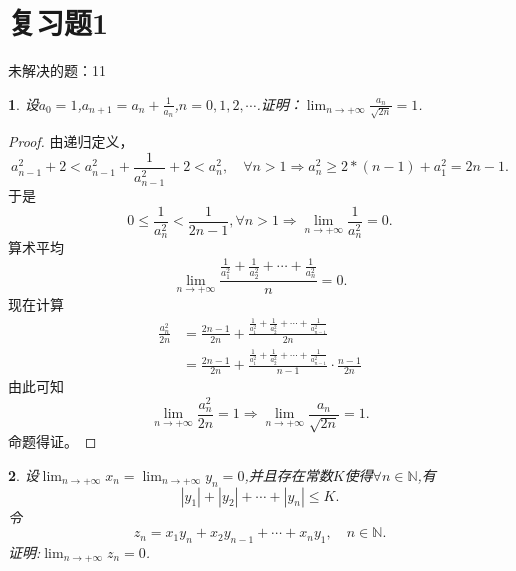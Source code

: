 \documentclass[utf8]{book}
\newtheorem{example}{}[section]             %
\begin{document}
\section{复习题1}
未解决的题：11\\
\begin{example}
设$a_0=1$,$a_{n+1}=a_n+\frac{1}{a_n}$,$n=0,1,2,\cdots$.证明：$\displaystyle\lim_{n\to +\infty}\frac{a_n}{\sqrt{2n}}= 1$.
\end{example}
\begin{proof}
由递归定义，
$$a_{n-1}^2+2 < a_{n-1}^2+\frac{1}{a^2_{n-1}} + 2< a_{n}^2,\quad\forall n > 1\Rightarrow a^2_{n}\geq 2*(n-1) + a_1^2=2n-1.$$
于是
$$0\leq \frac{1}{a_n^2} < \frac{1}{2n-1}, \forall n > 1\Rightarrow \displaystyle\lim_{n\to +\infty}\frac{1}{a_n^2}= 0.$$
算术平均
$$\displaystyle\lim_{n\to +\infty}\frac{\displaystyle\frac{1}{a_1^2}+\frac{1}{a_2^2} +\cdots +\frac{1}{a_n^2}}{n} = 0.$$
现在计算
\begin{equation*}
\begin{split}
\frac{a^2_n}{2n} &= \frac{2n-1}{2n} +\frac{\displaystyle\frac{1}{a_1^2}+\frac{1}{a_2^2} +\cdots +\frac{1}{a_{n-1}^2}}{2n}\\
&=\frac{2n-1}{2n} +\frac{\displaystyle\frac{1}{a_1^2}+\frac{1}{a_2^2} +\cdots +\frac{1}{a_{n-1}^2}}{n-1}\cdot\frac{n-1}{2n}
\end{split}
\end{equation*}
由此可知
$$\displaystyle\lim_{n\to +\infty}\frac{a^2_n}{2n}= 1\Rightarrow \displaystyle\lim_{n\to +\infty}\frac{a_n}{\sqrt{2n}}= 1.$$
命题得证。
\end{proof}
\begin{example}
设$\displaystyle\lim_{n\to +\infty}x_n=\lim_{n\to +\infty}y_n=0$,并且存在常数$K$使得$\forall n\in\mathbb{N}$,有$$|y_1|+|y_2|+\cdots+|y_n|\leq K.$$
令$$z_n=x_1y_n+x_2y_{n-1}+\cdots+x_ny_1,\quad n\in\mathbb{N}.$$证明:$\displaystyle\lim_{n\to +\infty}z_n=0$.
\end{example}
\end{document}
